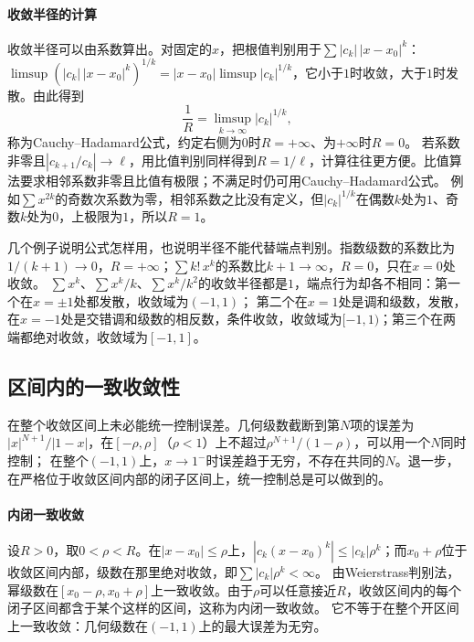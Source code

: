 \paragraph{收敛半径的计算}
收敛半径可以由系数算出。对固定的$x$，把根值判别用于$\sum|c_k|\,|x-x_0|^k$：$\limsup(|c_k|\,|x-x_0|^k)^{1/k}=|x-x_0|\limsup|c_k|^{1/k}$，它小于$1$时收敛，大于$1$时发散。由此得到
\[
 \frac1R=\limsup_{k\to\infty}|c_k|^{1/k},
\]
称为Cauchy--Hadamard公式，约定右侧为$0$时$R=+\infty$、为$+\infty$时$R=0$。
若系数非零且$|c_{k+1}/c_k|\to\ell$，用比值判别同样得到$R=1/\ell$，计算往往更方便。比值算法要求相邻系数非零且比值有极限；不满足时仍可用Cauchy--Hadamard公式。
例如$\sum x^{2k}$的奇数次系数为零，相邻系数之比没有定义，但$|c_k|^{1/k}$在偶数$k$处为$1$、奇数$k$处为$0$，上极限为$1$，所以$R=1$。

几个例子说明公式怎样用，也说明半径不能代替端点判别。指数级数的系数比为$1/(k+1)\to0$，$R=+\infty$；$\sum k!\,x^k$的系数比$k+1\to\infty$，$R=0$，只在$x=0$处收敛。
$\sum x^k$、$\sum x^k/k$、$\sum x^k/k^2$的收敛半径都是$1$，端点行为却各不相同：第一个在$x=\pm1$处都发散，收敛域为$(-1,1)$；
第二个在$x=1$处是调和级数，发散，在$x=-1$处是交错调和级数的相反数，条件收敛，收敛域为$[-1,1)$；第三个在两端都绝对收敛，收敛域为$[-1,1]$。

\subsection{区间内的一致收敛性}
\label{sec:ru-power-series-uniform}

在整个收敛区间上未必能统一控制误差。几何级数截断到第$N$项的误差为$|x|^{N+1}/|1-x|$，在$[-\rho,\rho]$（$\rho<1$）上不超过$\rho^{N+1}/(1-\rho)$，可以用一个$N$同时控制；
在整个$(-1,1)$上，$x\to1^-$时误差趋于无穷，不存在共同的$N$。退一步，在严格位于收敛区间内部的闭子区间上，统一控制总是可以做到的。

\paragraph{内闭一致收敛}
设$R>0$，取$0<\rho<R$。在$|x-x_0|\leq\rho$上，$|c_k(x-x_0)^k|\leq|c_k|\rho^k$；而$x_0+\rho$位于收敛区间内部，级数在那里绝对收敛，即$\sum|c_k|\rho^k<\infty$。
由Weierstrass判别法，幂级数在$[x_0-\rho,x_0+\rho]$上一致收敛。由于$\rho$可以任意接近$R$，收敛区间内的每个闭子区间都含于某个这样的区间，这称为内闭一致收敛。
它不等于在整个开区间上一致收敛：几何级数在$(-1,1)$上的最大误差为无穷。

